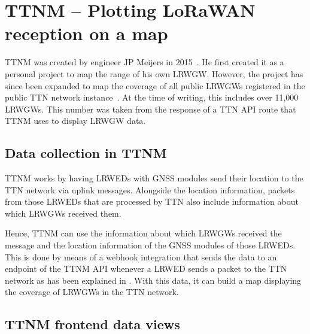 \section{\acl{TTNM} – Plotting \acs{LoRaWAN} reception on a map}

\acf{TTNM} was created by engineer JP Meijers in 2015~\cite{linkedin_23_nodate}.
He first created it as a personal project to map the range of his own \acl{LRWGW}.
However, the project has since been expanded to map the coverage of all public \aclp{LRWGW} registered in the public \ac{TTN} network instance~\cite{the_things_network_jp_2018}.
At the time of writing, this includes over 11,000 \aclp{LRWGW}.
This number was taken from the response of a \ac{TTN} \ac{API} route that \ac{TTNM} uses to display \acl{LRWGW} data.

\subsection{Data collection in \acl{TTNM}}\label{sec:ttm-data-collection}

\acl{TTNM} works by having \aclp{LRWED} with \ac{GNSS} modules send their location to the \ac{TTN} network via uplink messages.
Alongside the location information, packets from those \aclp{LRWED} that are processed by \ac{TTN} also include information about which \aclp{LRWGW} received them.

Hence, \acl{TTNM} can use the information about which \aclp{LRWGW} received the message and the location information of the \ac{GNSS} modules of those \aclp{LRWED}.
This is done by means of a webhook integration that sends the data to an endpoint of the \acl{TTNM} \ac{API} whenever a \acl{LRWED} sends a packet to the \ac{TTN} network as has been explained in .
With this data, it can build a map displaying the coverage of \aclp{LRWGW} in the \ac{TTN} network.

\subsection{\acl{TTNM} frontend data views}

